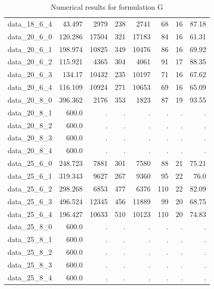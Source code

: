 \documentclass[preprint,12pt,authoryear]{elsarticle}
\begin{document}
\begin{table}[h!]
{\begin{tabular}{rrrrrrrr}
  data\_18\_6\_4 & 43.497 & 2979 & 238 & 2741 & 68 & 16 & 87.18 \\
  data\_20\_6\_0 & 120.286 & 17504 & 321 & 17183 & 84 & 16 & 61.31 \\
  data\_20\_6\_1 & 198.974 & 10825 & 349 & 10476 & 86 & 16 & 69.92 \\
  data\_20\_6\_2 & 115.921 & 4365 & 304 & 4061 & 91 & 17 & 88.35 \\
  data\_20\_6\_3 & 134.17 & 10432 & 235 & 10197 & 71 & 16 & 67.62 \\
  data\_20\_6\_4 & 116.109 & 10924 & 271 & 10653 & 69 & 16 & 65.09 \\
  data\_20\_8\_0 & 396.362 & 2176 & 353 & 1823 & 87 & 19 & 93.55 \\
  data\_20\_8\_1 & 600.0 & . & . & . & . & . & . \\
  data\_20\_8\_2 & 600.0 & . & . & . & . & . & . \\
  data\_20\_8\_3 & 600.0 & . & . & . & . & . & . \\
  data\_20\_8\_4 & 600.0 & . & . & . & . & . & . \\
  data\_25\_6\_0 & 248.723 & 7881 & 301 & 7580 & 88 & 21 & 75.21 \\
  data\_25\_6\_1 & 319.343 & 9627 & 267 & 9360 & 95 & 22 & 76.0 \\
  data\_25\_6\_2 & 298.268 & 6853 & 477 & 6376 & 110 & 22 & 82.09 \\
  data\_25\_6\_3 & 496.524 & 12345 & 456 & 11889 & 99 & 20 & 68.75 \\
  data\_25\_6\_4 & 196.427 & 10633 & 510 & 10123 & 110 & 20 & 74.83 \\
  data\_25\_8\_0 & 600.0 & . & . & . & . & . & . \\
  data\_25\_8\_1 & 600.0 & . & . & . & . & . & . \\
  data\_25\_8\_2 & 600.0 & . & . & . & . & . & . \\
  data\_25\_8\_3 & 600.0 & . & . & . & . & . & . \\
  data\_25\_8\_4 & 600.0 & . & . & . & . & . & . \\
  \hline
\end{tabular}
        }
        \caption{Numerical results for formulation G}
    \label{tab:G_results}
\end{table}
%
%



 



\end{document}
